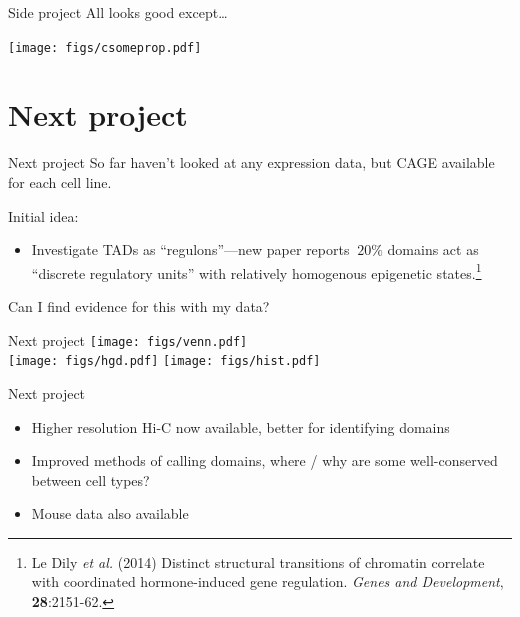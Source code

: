 \documentclass{beamer}
\begin{document}
\begin{frame}{Side project}
All looks good except\dots \\

\vspace{1em}

\centering

\texttt{[image: figs/csomeprop.pdf]} \\

\end{frame}

\section{Next project}
\begin{frame}{Next project}
  So far haven't looked at any expression data, but CAGE available for
  each cell line. \\

\vspace{1em}

Initial idea:\\

\vspace{1em}

\begin{itemize}
\item Investigate TADs as ``regulons''---new paper reports $~20\%$
  domains act as ``discrete regulatory units'' with relatively
  homogenous epigenetic states.\footnote{ {\tiny Le Dily \emph{et al.} (2014) Distinct structural transitions of chromatin correlate with
  coordinated hormone-induced gene regulation. \emph{Genes and
    Development}, {\bf 28}:2151-62.} } 
\end{itemize}

\vspace{1em}

Can I find evidence for this with my data?
\end{frame}

\begin{frame}{Next project}
\centering
\texttt{[image: figs/venn.pdf]} \\
\texttt{[image: figs/hgd.pdf]}
\texttt{[image: figs/hist.pdf]} 
\end{frame}

\begin{frame}{Next project}
\begin{itemize}
\item Higher resolution Hi-C now available, better for identifying domains
\item Improved methods of calling domains, where / why are some
  well-conserved between cell types?
\item Mouse data also available
\end{itemize}
\end{frame}
\end{document}
